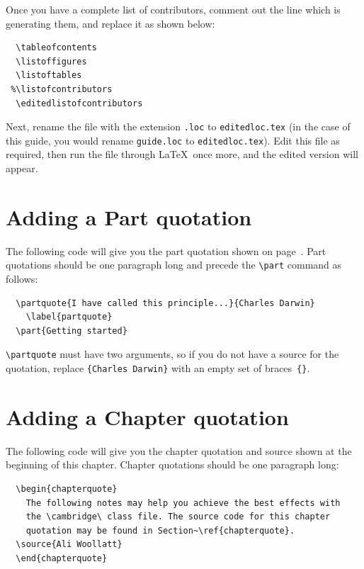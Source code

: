 Once you have a complete list of contributors, comment out the line which is generating them, and replace it as shown below:
\begin{verbatim}
  \tableofcontents
  \listoffigures
  \listoftables
 %\listofcontributors
  \editedlistofcontributors
\end{verbatim}
Next, rename the file with the extension \verb".loc" to \verb"editedloc.tex" (in the case of this guide, you would rename \texttt{\cambridge guide.loc} to \verb"editedloc.tex"). Edit this file as required, then run the file through \LaTeX\ once more, and the edited version will appear.

\section{Adding a Part quotation}
\label{partquotation}
The following code will give you the part quotation shown on page~\pageref{partquote}. Part quotations should be one paragraph long and precede the \verb"\part" command as follows:
\begin{verbatim}
  \partquote{I have called this principle...}{Charles Darwin}
    \label{partquote}
  \part{Getting started}
\end{verbatim}
\verb"\partquote" must have two arguments, so if you do not have a source for the quotation, replace \verb"{Charles Darwin}" with an empty set of braces~\verb"{}".

\section{Adding a Chapter quotation}\label{chapterquote}
The following code will give you the chapter quotation and source shown at the beginning of this chapter. Chapter quotations should be one paragraph long:
\begin{verbatim}
  \begin{chapterquote}
    The following notes may help you achieve the best effects with
    the \cambridge\ class file. The source code for this chapter
    quotation may be found in Section~\ref{chapterquote}.
  \source{Ali Woollatt}
  \end{chapterquote}
\end{verbatim}

